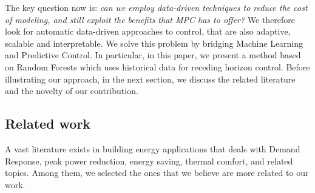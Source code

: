 \textcolor[rgb]{0,0,1}{The key question now is: \emph{can we employ data-driven techniques to reduce the cost of modeling, and still exploit the benefits that MPC has to offer?}
We therefore look for automatic data-driven approaches to control, that are also adaptive, scalable and interpretable.
We solve this problem by bridging Machine Learning and Predictive Control. In particular, in this paper, we present a method based on Random Forests which uses historical data for receding horizon control. Before illustrating our approach, in the next section, we discuss the related literature and the novelty of our contribution.}







\textcolor[rgb]{0,0,1}{
\subsection{Related work}
A vast literature exists in building energy applications that deals with Demand Response, peak power reduction, energy saving, thermal comfort, and related topics.
Among them, we selected the ones that we believe are more related to our work.}

